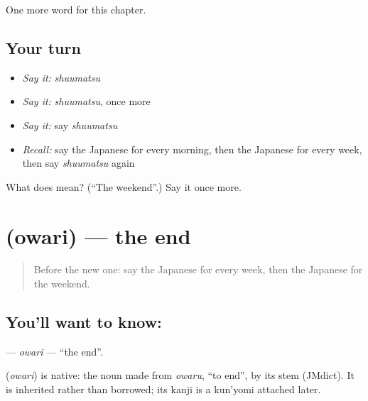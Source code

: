 \begin{grammarlens}[title={What you've built}]
One more word for this chapter.
\end{grammarlens}

\subsection*{Your turn}
\begin{itemize}
\raggedright
  \item \emph{Say it:} \emph{shuumatsu}
  \item \emph{Say it:} \emph{shuumatsu}, once more
  \item \emph{Say it:} say \emph{shuumatsu}
  \item \emph{Recall:} say the Japanese for every morning, then the Japanese for every week, then say \emph{shuumatsu} again
\end{itemize}

\begin{tcolorbox}[breakable,colback=teal!4,colframe=teal!35!black,title={Before you move on}]
What does  mean? (\textquotedblleft{}The weekend\textquotedblright{}.) Say it once more.
\end{tcolorbox}
\section[\texorpdfstring{\ja{おわり} (owari)}{おわり (owari)}]{ (owari) — the end}

\label{lesson:JA-C74-owari}



\begin{quote}
Before the new one: say the Japanese for every week, then the Japanese for the weekend.
\end{quote}

\subsection*{You'll want to know: }
\textbf{} — \emph{owari} — \textquotedblleft{}the end\textquotedblright{}.

\begin{cousinweb}
\textbf{} (\emph{owari}) is native: the noun made from \emph{owaru}, \textquotedblleft{}to end\textquotedblright{}, by its stem (JMdict). It is inherited rather than borrowed; its kanji is a kun'yomi attached later.
\end{cousinweb}

